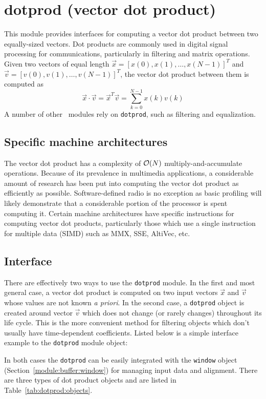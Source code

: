 % 
%

\newpage
\section{dotprod (vector dot product)}
\label{module:dotprod}

This module provides interfaces for computing a vector dot product
between two equally-sized vectors.
Dot products are commonly used in digital signal processing for
communications, particularly in filtering and matrix operations.
%
Given two vectors of equal length
$\vec{x} = \left[x(0),x(1),\ldots,x(N-1)\right]^T$ and
$\vec{v} = \left[v(0),v(1),\ldots,v(N-1)\right]^T$,
the vector dot product between them is computed as
%
\begin{equation}
    \vec{x} \cdot \vec{v}   =
    \vec{x}^T \vec{v}       =
    \sum_{k=0}^{N-1}{ x(k) v(k) }
\end{equation}
%
A number of other \liquid\ modules rely on {\tt dotprod},
such as filtering and equalization.

\subsection{Specific machine architectures}
\label{module:dotprod:arch}
The vector dot product has a complexity of $\mathcal{O}(N)$ multiply-and-accumulate
operations.
Because of its prevalence in multimedia applications, a considerable amount of
research has been put into computing the vector dot product as efficiently as
possible.
Software-defined radio is no exception as basic profiling will likely
demonstrate that a considerable portion of the processor is spent computing
it.
Certain machine architectures have specific instructions for computing vector
dot products, particularly those which use a single instruction for
multiple data (SIMD) such as MMX, SSE, AltiVec, etc.

\subsection{Interface}
\label{module:dotprod:usage}
There are effectively two ways to use the {\tt dotprod} module.
In the first and most general case, a vector dot product is computed on two
input vectors $\vec{x}$ and $\vec{v}$ whose values are not known
{\it a priori}.
%
In the second case, a {\tt dotprod} object is created around vector $\vec{v}$
which does not change (or rarely changes) throughout its life cycle.
This is the more convenient method for filtering objects which don't usually
have time-dependent coefficients.
Listed below is a simple interface example to the {\tt dotprod} module
object:
%

%
In both cases the {\tt dotprod} can be easily integrated with the
{\tt window} object (Section~\ref{module:buffer:window})
for managing input data and alignment.
There are three types of dot product objects and are listed in
Table~\ref{tab:dotprod:objects}.

